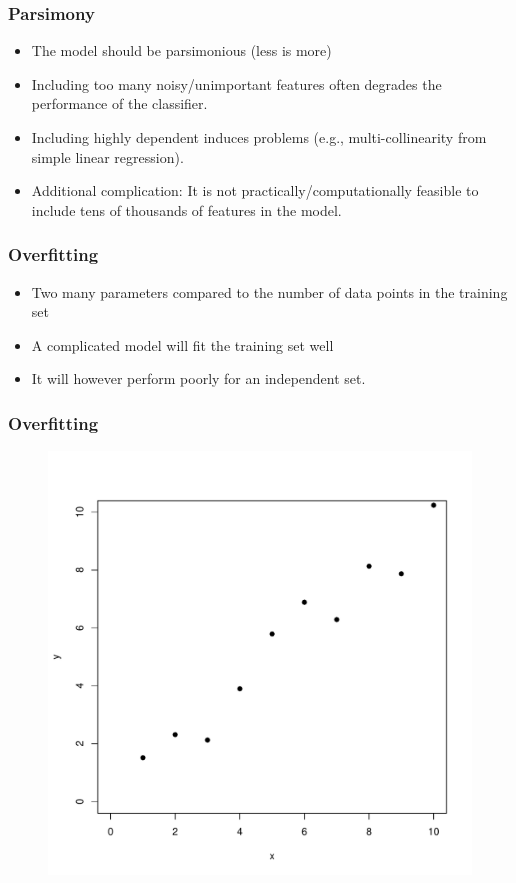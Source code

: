 \documentclass[xcolor=x11names,compress]{beamer}\usepackage[]{graphicx}\usepackage[]{color}
\newenvironment{knitrout}{}{} %
\begin{document}
\begin{frame}
  \frametitle{Parsimony}
  \begin{itemize}
\item The model should be parsimonious (less is more)
\item Including too many noisy/unimportant 
      features often degrades the performance of the classifier.
\item Including highly dependent induces problems (e.g., multi-collinearity from simple linear regression).
\item Additional complication:
      It is not practically/computationally feasible to include tens of thousands
      of features in the model. 
\end{itemize}
\end{frame}

\begin{frame}
  \frametitle{Overfitting}
  \begin{itemize}
\item Two many parameters compared to the number of data points in the training set
\item A complicated model will fit the training set well
\item It will however perform poorly for an independent set. 
\end{itemize}
\end{frame}


\begin{frame}[plain]
  \frametitle{Overfitting}
\begin{figure}
\centering
\begin{knitrout}\tiny
{}\color{fgcolor}

{\centering \includegraphics[width=.6\linewidth]{figure/beamer-unnamed-chunk-45-1} 

}



\end{knitrout}
\end{figure}
\end{frame}
\end{document}
